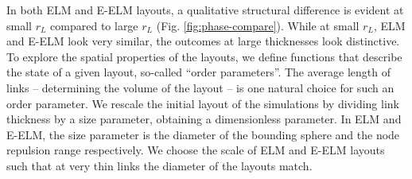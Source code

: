 \documentclass[nofootinbib,preprint,floatfix,endfloats]{revtex4} %
\begin{document}
In both ELM and E-ELM layouts, a qualitative structural difference is evident at small $r_L$ compared to large $r_L$ (Fig. \ref{fig:phase-compare}). While at small $r_L$, ELM and E-ELM look very similar, the outcomes at large thicknesses look distinctive. 
%
To explore the spatial  %
properties of the layouts, we define functions that describe the state of a given layout, so-called ``order parameters''. 
%
%
The average length of links -- determining the volume of the layout -- is one natural choice for such an order parameter.  
We rescale the initial layout of the simulations %
by dividing link thickness by a size parameter, obtaining a dimensionless parameter. 
In ELM and E-ELM, the size parameter is the diameter of the bounding sphere and the node repulsion range respectively. We choose the scale of ELM and E-ELM layouts such that at very thin links the diameter of the layouts match. 
\end{document}
